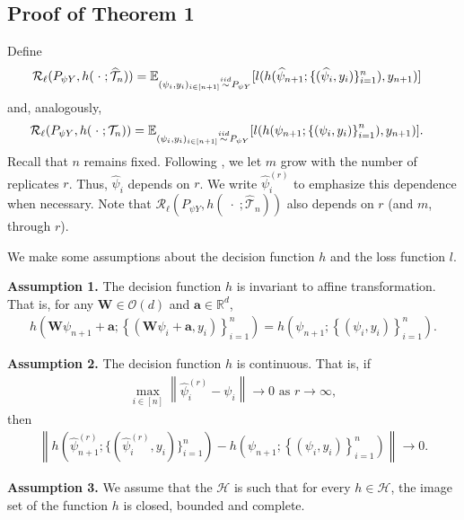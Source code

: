 \documentclass[11pt]{article}
\begin{document}
\subsection{Proof of Theorem 1}
Define 
\begin{align*}
 \mathcal{R}_{\ell}(P_{\psi Y},h(\; \cdot \;;\widehat{\mathcal{T}}_n))
&=\mathbb{E}_{(\psi_i,y_i)_{i \in [n+1]} \overset{iid}{\sim} P_{\psi Y}}
[
l(h(\widehat{\psi}_{n+1}
;
\lbrace (\widehat{\psi}_i,y_i)
\rbrace_{i=1}^n)
,y_{n+1})
]  
\end{align*}
and, analogously,
\begin{align*}
\mathcal{R}_{\ell}(P_{\psi Y},h(\;\cdot\; ;\mathcal{T}_n))&=\mathbb{E}_{(\psi_i,y_i)_{i \in [n+1]} \overset{iid}{\sim} P_{\psi Y}}
[
l(h(\psi_{n+1}
;
\left\lbrace (\psi_i,y_i)
\right\rbrace_{i=1}^n)
,y_{n+1})
].
\end{align*}
Recall that $ n $ remains fixed. Following \cite{aranyak}, we let  $ m $ grow with the number of replicates $r$. 
Thus, $\widehat{\psi}_i$ depends on $r$. 
We write $\widehat{\psi}_i^{(r)}$ to emphasize this dependence when necessary. 
Note that 
$
\mathcal{R}_{\ell}(P_{\psi Y},h(\;\cdot\;;\widehat{\mathcal{T}}_n))
$ also depends on $ r $ (and $ m $, through $ r $).

We make some assumptions about the decision function $ h $ and the loss function $l$. 

\noindent \textbf{Assumption 1.} The decision function $h$ is invariant to affine transformation.
That is, for any 
 $\mathbf{W} \in \mathcal{O}(d)$ and $\mathbf{a} \in \mathbb{R}^d$,
\begin{align*}
    h(\mathbf{W} \psi_{n+1}+\mathbf{a}; \left\lbrace 
(\mathbf{W} \psi_i+\mathbf{a},y_i) 
\right\rbrace_{i=1}^n
)=
h(\psi_{n+1};
\left\lbrace
 (\psi_i,
 y_i)
\right\rbrace_{i=1}^n
).
\end{align*}

\noindent \textbf{Assumption 2.} The decision function $h$ is continuous. That is, if
\begin{align*}
\max_{i \in [n]}
\left\lVert 
\widehat{\psi}_i^{(r)}-
\psi_i
\right\rVert
 \to 0 \text{ as } r \to \infty,
\end{align*}
then
\begin{align*}
\left\lVert
h \left(\widehat{\psi}_{n+1}^{(r)};
\lbrace (\widehat{\psi}_i^{(r)},y_i) \rbrace_{i=1}^n
\right)-
h \left(\psi_{n+1};
\left\lbrace (\psi_i,y_i) \right\rbrace_{i=1}^n
\right)
\right\rVert \to 0.
\end{align*}

\noindent \textbf{Assumption 3.} We assume that the $\mathcal{H}$ is such that for every $h \in \mathcal{H}$, the image set of the function $h$ is closed, bounded and complete.
\end{document}
